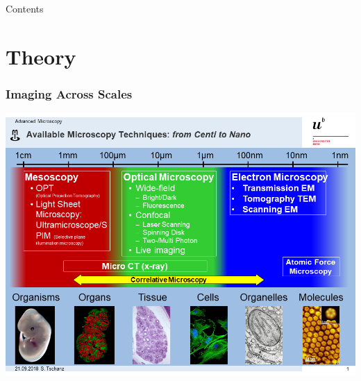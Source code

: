 \begin{frame}{Contents}
	\tableofcontents
\end{frame}

\section{Theory}
\begin{frame}
	\frametitle{Imaging Across Scales}
	\centering%
	\includegraphics[height=\imageheight]{./images/MIC-AM_techniques}%
\end{frame}

